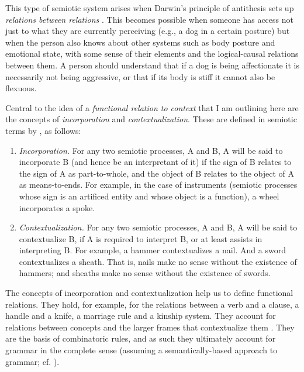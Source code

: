 This type of semiotic system arises when Darwin's principle of 
antithesis sets up \textit{relations between relations} \citep[12--17]{kockelman_agent_2013}. This becomes possible when someone has access not just to what they are currently perceiving (e.g., a dog in a certain posture) but when the person also knows about other systems such as body 
posture and emotional state, with some sense of their elements 
and the logical-causal relations between them. A person should understand that if a dog is 
being affectionate it is necessarily not being aggressive, or that if 
its body is stiff it cannot also be flexuous. 



Central to the idea of a \textit{functional relation to context} that I am outlining here are the concepts of \textit{incorporation }and 
\textit{contextualization}. These are defined in semiotic terms by 
\citet[29]{kockelman_residence_2006}, as follows:



\begin{enumerate}
\item[]\textit{Incorporation.} For any two semiotic processes, A and B, A will be said to incorporate B 
(and hence be an interpretant of it) if the sign of B relates to the 
sign of A as part-to-whole, and the object of B relates to the object of 
A as means-to-ends. For example, in the case of instruments (semiotic 
processes whose sign is an artificed entity and whose object is a 
function), a wheel incorporates a spoke.



\item[]\textit{Contextualization.} For any two semiotic processes, A and B, A will be said to contextualize 
B, if A is required to interpret B, or at least assists in interpreting 
B. For example, a hammer contextualizes a nail. And a sword 
contextualizes a sheath. That is, nails make no sense without the 
existence of hammers; and sheaths make no sense without the existence of 
swords.
\end{enumerate}



The concepts of incorporation and contextualization help us to define functional relations. They hold, for example, for the relations 
between a verb and a clause, a handle and a knife, a marriage rule and a 
kinship system. They account for relations between concepts and the larger frames that contextualize them \citep{FillmoreFrameSemantics1982}. They are the basis of combinatoric rules, and as such 
they ultimately account for grammar in the complete sense (assuming a 
semantically-based approach to grammar; cf. \citealt{langacker_foundations_1987,wierzbicka_semantics_1988,croft_explaining_2000,haspelmath_pre-established_2007}). 

